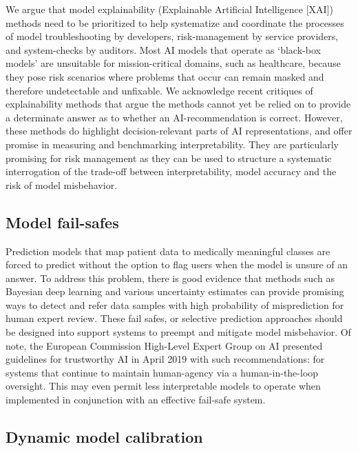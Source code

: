 We argue that model explainability (Explainable Artificial Intelligence
{[}XAI{]}) methods need to be prioritized to help systematize and
coordinate the processes of model troubleshooting by developers,
risk-management by service providers, and system-checks by
auditors.\citep{gunning2019, mueller2019, vilone2020, linardatos2020}
Most AI models that operate as `black-box models' are unsuitable for
mission-critical domains, such as healthcare, because they pose risk
scenarios where problems that occur can remain masked and therefore
undetectable and unfixable. We acknowledge recent
critiques\citep{ghassemi2021, krishna2022a} of explainability methods
that argue the methods cannot yet be relied on to provide a determinate
answer as to whether an AI-recommendation is correct. However, these
methods do highlight decision-relevant parts of AI representations, and
offer promise in measuring and benchmarking
interpretability\citep{doshi-velez2017, hoffman2018}. They are
particularly promising for risk management as they can be used to
structure a systematic interrogation of the trade-off between
interpretability, model accuracy and the risk of model misbehavior.

\hypertarget{model-fail-safes}{%
\subsection{Model fail-safes}\label{model-fail-safes}}

Prediction models that map patient data to medically meaningful classes
are forced to predict without the option to flag users when the model is
unsure of an answer. To address this problem, there is good evidence
that methods such as Bayesian deep learning and various uncertainty
estimates \citep{abdar2021} can provide promising ways to detect and
refer data samples with high probability of misprediction for human
expert review.\citep{leibig2017, filos2019, ghoshal2020} These fail
safes, or selective prediction approaches should be designed into
support systems to preempt and mitigate model
misbehavior.\citep{chow1970, bartlett2008, tortorella2000, elyaniv2010, feng2021}
Of note, the European Commission High-Level Expert Group on AI presented
guidelines for trustworthy AI in April 2019 with such recommendations:
for systems that continue to maintain human-agency via a
human-in-the-loop oversight. This may even permit less interpretable
models to operate when implemented in conjunction with an effective
fail-safe system.

\hypertarget{dynamic-model-calibration}{%
\subsection{Dynamic model calibration}\label{dynamic-model-calibration}}

